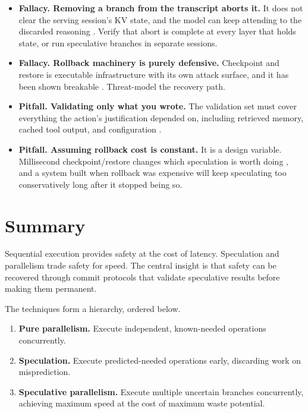 \begin{itemize}
\item \textbf{Fallacy. Removing a branch from the transcript aborts it.}
It does not clear the serving session's KV state, and the model can keep attending
to the discarded reasoning \cite{abortedkv2026}. Verify that abort is complete at
every layer that holds state, or run speculative branches in separate sessions.

\item \textbf{Fallacy. Rollback machinery is purely defensive.}
Checkpoint and restore is executable infrastructure with its own attack surface,
and it has been shown breakable \cite{saferesume2026}. Threat-model the recovery
path.

\item \textbf{Pitfall. Validating only what you wrote.}
The validation set must cover everything the action's justification depended on,
including retrieved memory, cached tool output, and configuration
\cite{coagent2026}.

\item \textbf{Pitfall. Assuming rollback cost is constant.}
It is a design variable. Millisecond checkpoint/restore changes which speculation
is worth doing \cite{deltabox2026, crab2026}, and a system built when rollback was
expensive will keep speculating too conservatively long after it stopped being so.
\end{itemize}

\section{Summary}

Sequential execution provides safety at the cost of latency. Speculation and parallelism trade safety for speed. The central insight is that safety can be recovered through commit protocols that validate speculative results before making them permanent.

The techniques form a hierarchy, ordered below.
\begin{enumerate}
\item \textbf{Pure parallelism.} Execute independent, known-needed operations concurrently.
\item \textbf{Speculation.} Execute predicted-needed operations early, discarding work on misprediction.
\item \textbf{Speculative parallelism.} Execute multiple uncertain branches concurrently, achieving maximum speed at the cost of maximum waste potential.
\end{enumerate}

